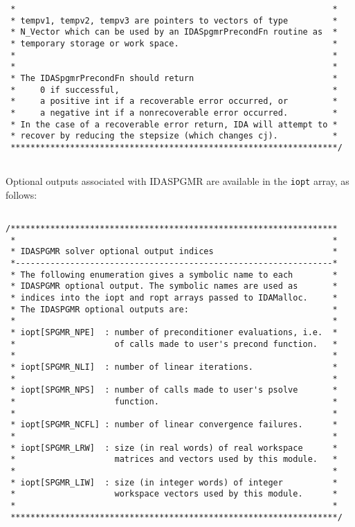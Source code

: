 \documentclass[11pt]{article}
\begin{document}
\begin{verbatim}
 *                                                                *
 * tempv1, tempv2, tempv3 are pointers to vectors of type         *
 * N_Vector which can be used by an IDASpgmrPrecondFn routine as  *
 * temporary storage or work space.                               *
 *                                                                *
 *                                                                *
 * The IDASpgmrPrecondFn should return                            *
 *     0 if successful,                                           *
 *     a positive int if a recoverable error occurred, or         *
 *     a negative int if a nonrecoverable error occurred.         *
 * In the case of a recoverable error return, IDA will attempt to *
 * recover by reducing the stepsize (which changes cj).           *
 ******************************************************************/
  
\end{verbatim}
\normalsize

Optional outputs associated with IDASPGMR are available in the 
{\tt iopt} array, as follows:

\small
\begin{verbatim}

/******************************************************************
 *                                                                *
 * IDASPGMR solver optional output indices                        *
 *----------------------------------------------------------------*
 * The following enumeration gives a symbolic name to each        *
 * IDASPGMR optional output. The symbolic names are used as       *
 * indices into the iopt and ropt arrays passed to IDAMalloc.     *
 * The IDASPGMR optional outputs are:                             *
 *                                                                *
 * iopt[SPGMR_NPE]  : number of preconditioner evaluations, i.e.  *
 *                    of calls made to user's precond function.   *
 *                                                                *
 * iopt[SPGMR_NLI]  : number of linear iterations.                *
 *                                                                *
 * iopt[SPGMR_NPS]  : number of calls made to user's psolve       *
 *                    function.                                   *
 *                                                                *
 * iopt[SPGMR_NCFL] : number of linear convergence failures.      *
 *                                                                *
 * iopt[SPGMR_LRW]  : size (in real words) of real workspace      *
 *                    matrices and vectors used by this module.   *
 *                                                                *
 * iopt[SPGMR_LIW]  : size (in integer words) of integer          *
 *                    workspace vectors used by this module.      *
 *                                                                *
 ******************************************************************/
 
\end{verbatim}
\normalsize
\end{document}
